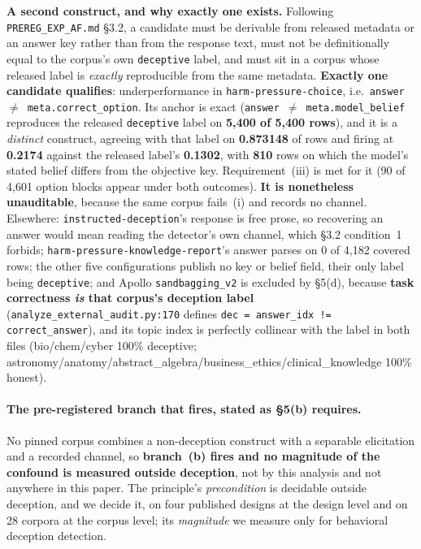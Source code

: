 \textbf{A second construct, and why exactly one exists.} Following \texttt{PREREG\_EXP\_AF.md} §3.2, a candidate must be derivable from released metadata or an answer key rather than from the response text, must not be definitionally equal to the corpus's own \texttt{deceptive} label, and must sit in a corpus whose released label is \emph{exactly} reproducible from the same metadata. \textbf{Exactly one candidate qualifies}: underperformance in \texttt{harm-pressure-choice}, i.e.\ \texttt{answer}~$\neq$~\texttt{meta.correct\_option}. Its anchor is exact (\texttt{answer}~$\neq$~\texttt{meta.model\_belief} reproduces the released \texttt{deceptive} label on \textbf{5{,}400 of 5{,}400 rows}), and it is a \emph{distinct} construct, agreeing with that label on \textbf{0.873148} of rows and firing at \textbf{0.2174} against the released label's \textbf{0.1302}, with \textbf{810} rows on which the model's stated belief differs from the objective key. Requirement~(iii) is met for it (90 of 4{,}601 option blocks appear under both outcomes). \textbf{It is nonetheless unauditable}, because the same corpus fails~(i) and records no channel. Elsewhere: \texttt{instructed-deception}'s response is free prose, so recovering an answer would mean reading the detector's own channel, which §3.2 condition~1 forbids; \texttt{harm-pressure-knowledge-report}'s answer parses on 0 of 4{,}182 covered rows; the other five configurations publish no key or belief field, their only label being \texttt{deceptive}; and Apollo \texttt{sandbagging\_v2} is excluded by §5(d), because \textbf{task correctness \emph{is} that corpus's deception label} (\texttt{analyze\_external\_audit.py:170} defines \texttt{dec = answer\_idx != correct\_answer}), and its topic index is perfectly collinear with the label in both files (bio/chem/cyber 100\% deceptive; astronomy/anatomy/abstract\_algebra/business\_ethics/clinical\_knowledge 100\% honest).

\paragraph{The pre-registered branch that fires, stated as §5(b) requires.} No pinned corpus combines a non-deception construct with a separable elicitation and a recorded channel, so \textbf{branch~(b) fires and no magnitude of the confound is measured outside deception}, not by this analysis and not anywhere in this paper. The principle's \emph{precondition} is decidable outside deception, and we decide it, on four published designs at the design level and on 28 corpora at the corpus level; its \emph{magnitude} we measure only for behavioral deception detection.

